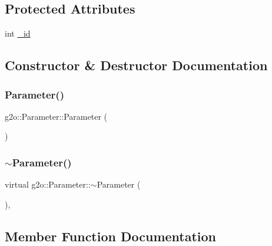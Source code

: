 \subsection*{Protected Attributes}
\begin{DoxyCompactItemize}
\item 
int \mbox{\hyperlink{classg2o_1_1_parameter_a602d08079c6a3a5f868e41a102e1db0b}{\+\_\+id}}
\end{DoxyCompactItemize}


\subsection{Constructor \& Destructor Documentation}
\mbox{\label{classg2o_1_1_parameter_a34ef4c50461a0ab0ae9bd26944fac4de}} 
\subsubsection{\texorpdfstring{Parameter()}{Parameter()}}
{\footnotesize\ttfamily g2o\+::\+Parameter\+::\+Parameter (\begin{DoxyParamCaption}{ }\end{DoxyParamCaption})}

\mbox{\label{classg2o_1_1_parameter_a03a4d78df10d25ddf14a52872f872913}} 
\subsubsection{\texorpdfstring{$\sim$\+Parameter()}{~Parameter()}}
{\footnotesize\ttfamily virtual g2o\+::\+Parameter\+::$\sim$\+Parameter (\begin{DoxyParamCaption}{ }\end{DoxyParamCaption})\hspace{0.3cm}{\ttfamily [inline]}, {\ttfamily [virtual]}}



\subsection{Member Function Documentation}
\mbox{\label{classg2o_1_1_parameter_a44ace751794dcde7a5fd52d16e2f4f21}} 
